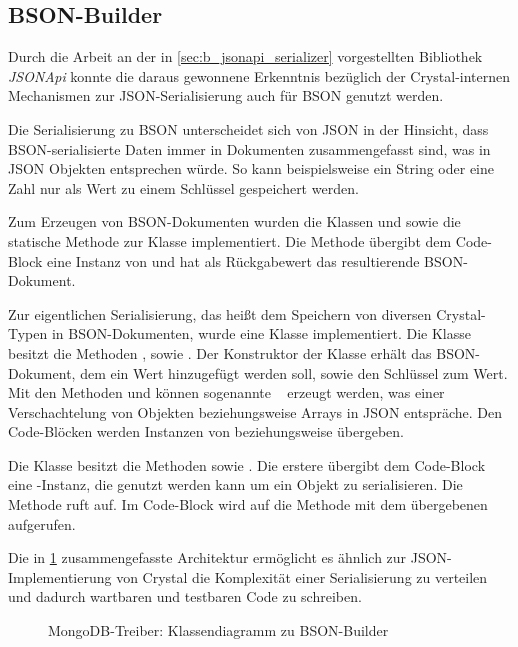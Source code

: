 \subsection{BSON-Builder}
\label{ssec:bm_bson_builder}

Durch die Arbeit an der in \cref{sec:b_jsonapi_serializer} vorgestellten
Bibliothek \emph{JSONApi} konnte die daraus gewonnene Erkenntnis bezüglich der
Crystal-internen Mechanismen zur JSON-Serialisierung auch für BSON genutzt
werden.

Die Serialisierung zu BSON unterscheidet sich von JSON in der Hinsicht, dass
BSON-serialisierte Daten immer in Dokumenten zusammengefasst sind, was in JSON
Objekten entsprechen würde.  So kann beispielsweise ein String oder eine Zahl
nur als Wert zu einem Schlüssel gespeichert werden.

Zum Erzeugen von BSON-Dokumenten wurden die Klassen  und
 sowie die statische Methode  zur
Klasse  implementiert.  Die Methode übergibt dem Code-Block eine
Instanz von  und hat als Rückgabewert das resultierende
BSON-Dokument.

Zur eigentlichen Serialisierung, das heißt dem Speichern von diversen
Crystal-Typen in BSON-Dokumenten, wurde eine Klasse 
implementiert.  Die Klasse besitzt die Methoden ,
 sowie .  Der Konstruktor der
Klasse erhält das BSON-Dokument, dem ein Wert hinzugefügt werden soll, sowie
den Schlüssel zum Wert.  Mit den Methoden  und
 können sogenannte ~\cite{mongo-embedded-docs} erzeugt werden, was einer Verschachtelung
von Objekten beziehungsweise Arrays in JSON entspräche.  Den Code-Blöcken werden
Instanzen von  beziehungsweise 
übergeben.

Die Klasse  besitzt die Methoden 
sowie .  Die erstere übergibt dem Code-Block eine
-Instanz, die genutzt werden kann um ein Objekt zu
serialisieren.  Die Methode  ruft
 auf.  Im Code-Block wird auf  die Methode
 mit dem übergebenen  aufgerufen.

Die in \cref{fig:mongocr_builder_klassendiagramm} zusammengefasste Architektur
ermöglicht es ähnlich zur JSON-Implementierung von Crystal die Komplexität
einer Serialisierung zu verteilen und dadurch wartbaren und testbaren Code zu
schreiben.

\begin{figure}
	\centering
	
	\caption{MongoDB-Treiber: Klassendiagramm zu BSON-Builder}
	\label{fig:mongocr_builder_klassendiagramm}
\end{figure}
